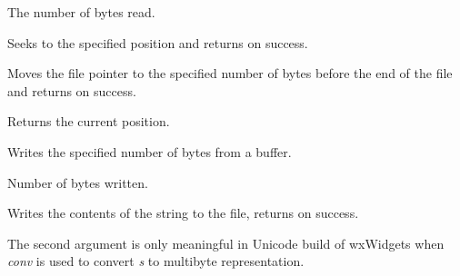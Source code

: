 

The number of bytes read.


\label{wxffileseek}


Seeks to the specified position and returns \true on success.





\label{wxffileseekend}


Moves the file pointer to the specified number of bytes before the end of the file
and returns \true on success.




\label{wxffiletell}


Returns the current position.


\label{wxffilewrite}


Writes the specified number of bytes from a buffer.





Number of bytes written.


\label{wxffilewrites}


Writes the contents of the string to the file, returns \true on success.

The second argument is only meaningful in Unicode build of wxWidgets when
{\it conv} is used to convert {\it s} to multibyte representation.


